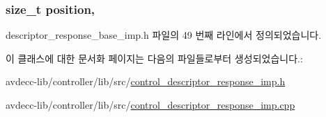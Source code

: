 \subsubsection[{\texorpdfstring{position}{position}}]{\setlength{\rightskip}{0pt plus 5cm}size\+\_\+t position\hspace{0.3cm}{\ttfamily [protected]}, {\ttfamily [inherited]}}\hypertarget{classavdecc__lib_1_1descriptor__response__base__imp_a7a04afe5347934be732ec70a70bd0a28}{}\label{classavdecc__lib_1_1descriptor__response__base__imp_a7a04afe5347934be732ec70a70bd0a28}


descriptor\+\_\+response\+\_\+base\+\_\+imp.\+h 파일의 49 번째 라인에서 정의되었습니다.



이 클래스에 대한 문서화 페이지는 다음의 파일들로부터 생성되었습니다.\+:\begin{DoxyCompactItemize}
\item 
avdecc-\/lib/controller/lib/src/\hyperlink{control__descriptor__response__imp_8h}{control\+\_\+descriptor\+\_\+response\+\_\+imp.\+h}\item 
avdecc-\/lib/controller/lib/src/\hyperlink{control__descriptor__response__imp_8cpp}{control\+\_\+descriptor\+\_\+response\+\_\+imp.\+cpp}\end{DoxyCompactItemize}
